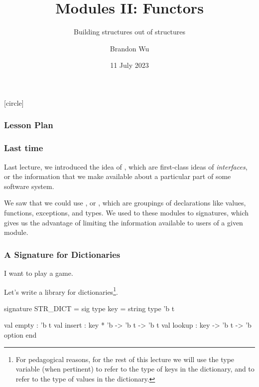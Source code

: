 \documentclass[aspectratio=169, handout]{beamer}
\title{Modules II: Functors} %
\subtitle{Building structures out of structures} %
\date{11 July 2023} %
\author{Brandon Wu} %
\newif\ifcolorlambda
\begin{document}
\ifweb
    \renewcommand{\pause}{}
\fi

[circle]

{
\begin{frame}[plain]
    \colorlambdatrue
    \titlepage
\end{frame}
}

\begin{frame}[fragile]
  \frametitle{Lesson Plan}

  \tableofcontents
\end{frame}


\begin{frame}[fragile]
  \frametitle{Last time}

  Last lecture, we introduced the idea of , which are first-class
  ideas of \textit{interfaces}, or the information that we make available about a
  particular part of some software system.

  \pause
  \vspace{\fill}

  We saw that we could use , or , which are groupings
  of declarations like values, functions, exceptions, and types. We used
   to  these modules to
  signatures, which gives us the advantage of limiting the information available to
  users of a given module.
\end{frame}


\begin{frame}[fragile]
  \frametitle{A Signature for Dictionaries}

  I want to play a game.

  \pause
  \vspace{\fill}

  Let's write a library for dictionaries\footnote{For pedagogical reasons,
  for the rest of this lecture we will use the type variable 
  (when pertinent) to refer to the type of keys in the dictionary, and
   to refer to the type of values in the dictionary.}.

  \pause
  \vspace{\fill}

  \begin{codeblock}
    signature STR_DICT =
      sig
        type key = string
        type 'b t

        val empty : 'b t
        val insert : key * 'b -> 'b t -> 'b t
        val lookup : key -> 'b t -> 'b option
      end
  \end{codeblock}
\end{frame}
\end{document}
